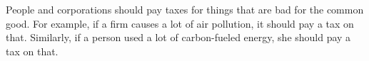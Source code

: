 People and corporations should pay taxes for things that are bad for the common good.
For example, if a firm causes a lot of air pollution, it should pay a tax on that.
Similarly, if a person used a lot of carbon-fueled energy, she should pay a tax on that.